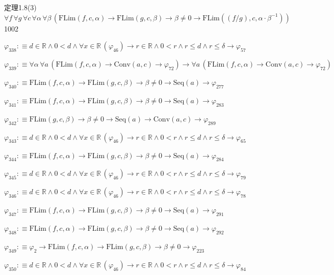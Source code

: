 \begin{fullproof}{定理1.8(3)}{$\forall f\,\forall g\,\forall c\,\forall \alpha\,\forall \beta\,(\mathrm{FLim}(f,c,\alpha) \to \mathrm{FLim}(g,c,\beta) \to \beta \neq 0 \to \mathrm{FLim}((f / g),c,\alpha \cdot \beta^{-1}))$}{1002}
\begin{abbrevlist}
\item $\varphi_{338} :\equiv d \in \mathbb{R} \land 0 < d \land \forall x \in \mathbb{R}\,(\varphi_{46}) \to r \in \mathbb{R} \land 0 < r \land r \leq d \land r \leq \delta \to \varphi_{57}$
\item $\varphi_{339} :\equiv \forall \alpha\,\forall a\,(\mathrm{FLim}(f,c,\alpha) \to \mathrm{Conv}(a,c) \to \varphi_{72}) \to \forall a\,(\mathrm{FLim}(f,c,\alpha) \to \mathrm{Conv}(a,c) \to \varphi_{72})$
\item $\varphi_{340} :\equiv \mathrm{FLim}(f,c,\alpha) \to \mathrm{FLim}(g,c,\beta) \to \beta \neq 0 \to \mathrm{Seq}(a) \to \varphi_{277}$
\item $\varphi_{341} :\equiv \mathrm{FLim}(f,c,\alpha) \to \mathrm{FLim}(g,c,\beta) \to \beta \neq 0 \to \mathrm{Seq}(a) \to \varphi_{283}$
\item $\varphi_{342} :\equiv \mathrm{FLim}(g,c,\beta) \to \beta \neq 0 \to \mathrm{Seq}(a) \to \mathrm{Conv}(a,c) \to \varphi_{289}$
\item $\varphi_{343} :\equiv d \in \mathbb{R} \land 0 < d \land \forall x \in \mathbb{R}\,(\varphi_{46}) \to r \in \mathbb{R} \land 0 < r \land r \leq d \land r \leq \delta \to \varphi_{65}$
\item $\varphi_{344} :\equiv \mathrm{FLim}(f,c,\alpha) \to \mathrm{FLim}(g,c,\beta) \to \beta \neq 0 \to \mathrm{Seq}(a) \to \varphi_{284}$
\item $\varphi_{345} :\equiv d \in \mathbb{R} \land 0 < d \land \forall x \in \mathbb{R}\,(\varphi_{46}) \to r \in \mathbb{R} \land 0 < r \land r \leq d \land r \leq \delta \to \varphi_{79}$
\item $\varphi_{346} :\equiv d \in \mathbb{R} \land 0 < d \land \forall x \in \mathbb{R}\,(\varphi_{46}) \to r \in \mathbb{R} \land 0 < r \land r \leq d \land r \leq \delta \to \varphi_{78}$
\item $\varphi_{347} :\equiv \mathrm{FLim}(f,c,\alpha) \to \mathrm{FLim}(g,c,\beta) \to \beta \neq 0 \to \mathrm{Seq}(a) \to \varphi_{291}$
\item $\varphi_{348} :\equiv \mathrm{FLim}(f,c,\alpha) \to \mathrm{FLim}(g,c,\beta) \to \beta \neq 0 \to \mathrm{Seq}(a) \to \varphi_{292}$
\item $\varphi_{349} :\equiv \varphi_{2} \to \mathrm{FLim}(f,c,\alpha) \to \mathrm{FLim}(g,c,\beta) \to \beta \neq 0 \to \varphi_{223}$
\item $\varphi_{350} :\equiv d \in \mathbb{R} \land 0 < d \land \forall x \in \mathbb{R}\,(\varphi_{46}) \to r \in \mathbb{R} \land 0 < r \land r \leq d \land r \leq \delta \to \varphi_{84}$

\end{abbrevlist}
\end{fullproof}
